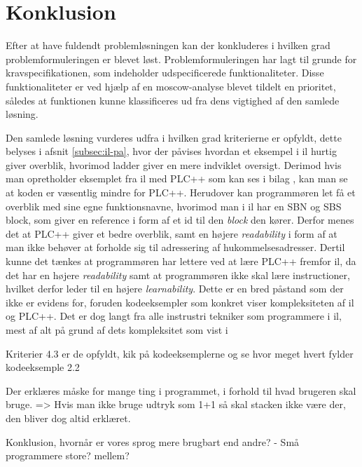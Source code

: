 \chapter{Konklusion}
\label{sec:konklusion}

Efter at have fuldendt problemløsningen kan der konkluderes i hvilken grad problemformuleringen er blevet løst.
Problemformuleringen har lagt til grunde for kravspecifikationen, som indeholder udspecificerede funktionaliteter.
Disse funktionaliteter er ved hjælp af en \gls{moscow}-analyse blevet tildelt en prioritet, således at funktionen kunne klassificeres ud fra dens vigtighed af den samlede løsning.

Den samlede løsning vurderes udfra i hvilken grad kriterierne er opfyldt, dette belyses i afsnit \ref{subsec:il-pa}, hvor der påvises hvordan et eksempel i \gls{il} hurtig giver overblik, hvorimod \gls{ladder} giver en mere indviklet oversigt. Derimod hvis man opretholder eksemplet fra \gls{il} med PLC++ som kan ses i bilag \label{bil:semantik}, kan man se at koden er væsentlig mindre for PLC++.
Herudover kan programmøren let få et overblik med sine egne funktionsnavne, hvorimod man i \gls{il} har en SBN og SBS block, som giver en reference i form af et id til den \textit{block} den kører.
Derfor menes det at PLC++ giver et bedre overblik, samt en højere \textit{readability} i form af at man ikke behøver at forholde sig til adressering af hukommelsesadresser.
Dertil kunne det tænkes at programmøren har lettere ved at lære PLC++ fremfor \gls{il}, da det har en højere  \textit{readability} samt at programmøren ikke skal lære instructioner, hvilket derfor leder til en højere \textit{learnability}. Dette er en bred påstand som der ikke er evidens for, foruden kodeeksempler som konkret viser kompleksiteten af \gls{il} og PLC++.
Det er dog langt fra alle instrustri tekniker som programmere i \gls{il}, mest af alt på grund af dets kompleksitet som vist i  






Kriterier 4.3 er de opfyldt, kik på kodeeksemplerne og se hvor meget hvert fylder kodeeksemple 2.2

Der erklæres måske for mange ting i programmet, i forhold til hvad brugeren skal bruge. => Hvis man ikke bruge udtryk som 1+1 så skal stacken ikke være der, den bliver dog altid erklæret.

Konklusion, hvornår er vores sprog mere brugbart end andre? - Små programmere store? mellem?

